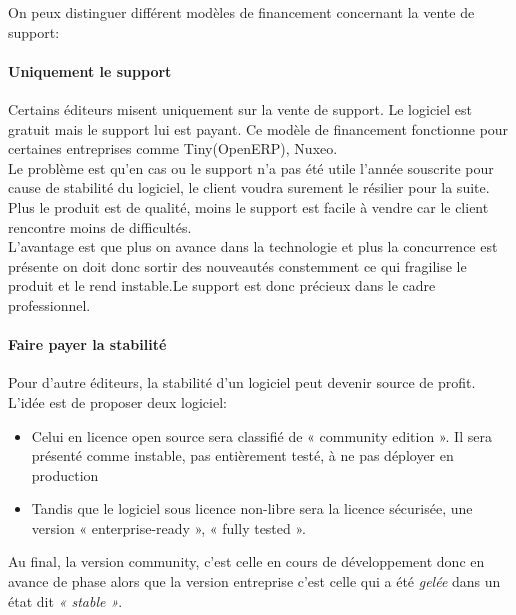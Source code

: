 				On peux distinguer différent modèles de financement concernant la vente de support:

				\paragraph{Uniquement le support\\}

					Certains éditeurs misent uniquement sur la vente de support. Le logiciel est gratuit mais le support lui est payant. Ce modèle de financement fonctionne pour certaines entreprises comme Tiny(OpenERP), Nuxeo.\\

					Le problème est qu'en cas ou le support n'a pas été utile l'année souscrite pour cause de stabilité du logiciel, le client voudra surement le résilier pour la suite.\\

					Plus le produit est de qualité, moins le support est facile à vendre car le client rencontre moins de difficultés.\\

					L'avantage est que plus on avance dans la technologie et plus la concurrence est présente on doit donc sortir des nouveautés constemment ce qui fragilise le produit et le rend instable.Le support est donc précieux dans le cadre professionnel.

				\paragraph{Faire payer la stabilité\\}

					Pour d'autre éditeurs, la stabilité d'un logiciel peut devenir source de profit. L'idée est de proposer deux logiciel:\\

					\begin{itemize}[label=\textbullet, font=\LARGE \color{burntorange}]
						\item Celui en licence open source sera classifié de « community edition ». Il sera présenté comme instable, pas entièrement testé, à ne pas déployer en production
						\item Tandis que le logiciel sous licence non-libre sera la licence sécurisée, une version « enterprise-ready », « fully tested ».
					\end{itemize} 

					Au final, la version community, c'est celle en cours de développement donc en avance de phase alors que la version entreprise c'est celle qui a été \textit{gelée} dans un état dit \textit{« stable »}.\\

